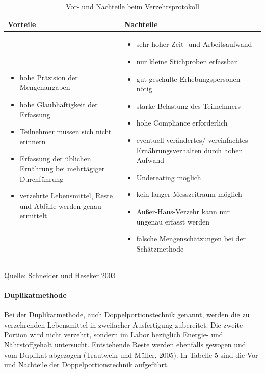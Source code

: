 \begin{table}[!h]
\begin{flushleft}
\caption{Vor- und Nachteile beim Verzehrsprotokoll}
\end{flushleft}
\begin{tabular}{p{7cm} p{7cm}}
Vorteile & Nachteile \\
\hline

\begin{itemize}
\item hohe Präzision der Mengenangaben
\item hohe Glaubhaftigkeit der Erfassung
\item Teilnehmer müssen sich nicht erinnern
\item Erfassung der üblichen Ernährung bei mehrtägiger Durchführung
\item verzehrte Lebensmittel, Reste und Abfälle werden genau ermittelt


\end{itemize}

&

\begin{itemize}
\item sehr hoher Zeit- und Arbeitsaufwand
\item nur kleine Stichproben erfassbar
\item gut geschulte Erhebungspersonen nötig
\item starke Belastung des Teilnehmers
\item hohe Compliance erforderlich
\item eventuell verändertes/ vereinfachtes Ernährungsverhalten durch hohen Aufwand
\item Undereating möglich
\item kein langer Messzeitraum möglich
\item Außer-Haus-Verzehr kann nur ungenau erfasst werden
\item falsche Mengenschätzungen bei der Schätzmethode

\end{itemize}
\end{tabular}
\label{tab:Verzehrsprotokoll}
Quelle: Schneider und Heseker 2003
\end{table}



\paragraph{Duplikatmethode}

Bei der Duplikatmethode, auch Doppelportionstechnik genannt, werden die zu verzehrenden Lebensmittel in zweifacher Ausfertigung zubereitet. Die zweite Portion wird nicht verzehrt, sondern im Labor bezüglich Energie- und Nährstoffgehalt untersucht. Entstehende Reste werden ebenfalls gewogen und vom Duplikat abgezogen (Trautwein und Müller, 2005). In Tabelle 5 sind die Vor- und Nachteile der Doppelportionstechnik aufgeführt.


